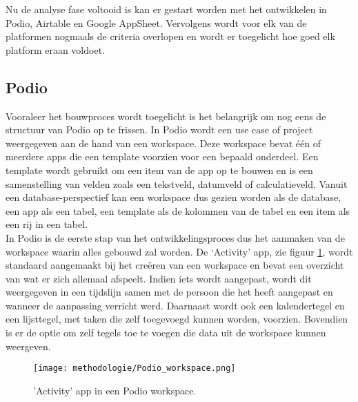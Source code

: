 Nu de analyse fase voltooid is kan er gestart worden met het ontwikkelen in Podio, Airtable en Google AppSheet. Vervolgens wordt voor elk van de platformen nogmaals de criteria overlopen en wordt er toegelicht hoe goed elk platform eraan voldoet. \\

\newpage



\subsection{Podio} %

Vooraleer het bouwproces wordt toegelicht is het belangrijk om nog eens de structuur van Podio op te frissen. In Podio wordt een use case of project weergegeven aan de hand van een workspace. Deze workspace bevat één of meerdere apps die een template voorzien voor een bepaald onderdeel. Een template wordt gebruikt om een item van de app op te bouwen en is een samenstelling van velden zoals een tekstveld, datumveld of calculatieveld. Vanuit een database-perspectief kan een workspace dus gezien worden als de database, een app als een tabel, een template als de kolommen van de tabel en een item als een rij in een tabel. \\

In Podio is de eerste stap van het ontwikkelingsproces dus het aanmaken van de workspace waarin alles gebouwd zal worden. De ‘Activity’ app, zie figuur \ref{fig:meth_podio_workspace}, wordt standaard aangemaakt bij het creëren van een workspace en bevat een overzicht van wat er zich allemaal afspeelt. Indien iets wordt aangepast, wordt dit weergegeven in een tijdslijn samen met de persoon die het heeft aangepast en wanneer de aanpassing verricht werd. Daarnaast wordt ook een kalendertegel en een lijsttegel, met taken die zelf toegevoegd kunnen worden, voorzien. Bovendien is er de optie om zelf tegels toe te voegen die data uit de workspace kunnen weergeven. \\

\begin{figure}[h]
    \centering
    \texttt{[image: methodologie/Podio\_workspace.png]}
    \caption{'Activity' app in een Podio workspace.}
    \label{fig:meth_podio_workspace}
\end{figure}

